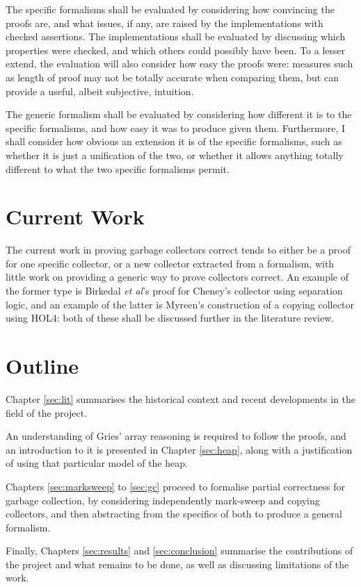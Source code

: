 The specific formalisms shall be evaluated by considering how
convincing the proofs are, and what issues, if any, are raised by the
implementations with checked assertions. The implementations shall be
evaluated by discussing which properties were checked, and which
others could possibly have been. To a lesser extend, the evaluation
will also consider how easy the proofs were: measures such as length
of proof may not be totally accurate when comparing them, but can
provide a useful, albeit subjective, intuition.

The generic formalism shall be evaluated by considering how different
it is to the specific formalisms, and how easy it was to produce given
them. Furthermore, I shall consider how obvious an extension it is of
the specific formalisms, such as whether it is just a unification of
the two, or whether it allows anything totally different to what the
two specific formalisms permit.

\section{Current Work}
\label{sec:intro-current}

The current work in proving garbage collectors correct tends to either
be a proof for one specific collector, or a new collector extracted
from a formalism, with little work on providing a generic way to prove
collectors correct. An example of the former type is Birkedal
\textit{et al}'s\cite{Birkedal04} proof for Cheney's collector using
separation logic, and an example of the latter is
Myreen's\cite{Myreen10} construction of a copying collector using
HOL4: both of these shall be discussed further in the literature
review.
\section{Outline}
\label{sec:intro-outline}

Chapter \ref{sec:lit} summarises the historical context and recent
developments in the field of the project.

An understanding of Gries' array reasoning\cite{Gries87} is required
to follow the proofs, and an introduction to it is presented in
Chapter \ref{sec:heap}, along with a justification of using that
particular model of the heap.

Chapters \ref{sec:marksweep} to \ref{sec:gc} proceed to formalise
partial correctness for garbage collection, by considering
independently mark-sweep and copying collectors, and then abstracting
from the specifics of both to produce a general formalism.

Finally, Chapters \ref{sec:results} and \ref{sec:conclusion} summarise
the contributions of the project and what remains to be done, as well
as discussing limitations of the work.

